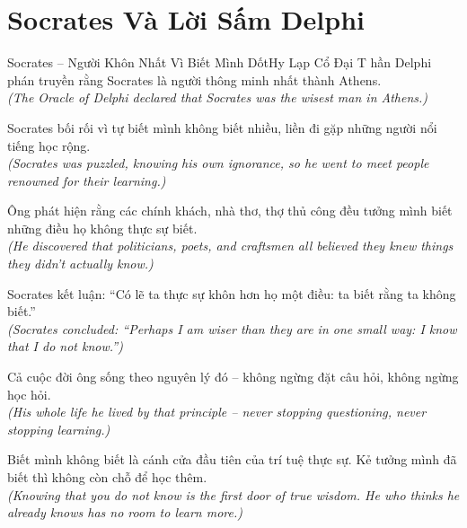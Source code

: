 \section{Socrates Và Lời Sấm Delphi}
\begin{truyen}{Socrates -- Người Khôn Nhất Vì Biết Mình Dốt}{Hy Lạp Cổ Đại}
T hần Delphi phán truyền rằng Socrates là người thông minh nhất thành Athens.\\
\textit{(The Oracle of Delphi declared that Socrates was the wisest man in Athens.)}

Socrates bối rối vì tự biết mình không biết nhiều, liền đi gặp những người nổi tiếng học rộng.\\
\textit{(Socrates was puzzled, knowing his own ignorance, so he went to meet people renowned for their learning.)}

Ông phát hiện rằng các chính khách, nhà thơ, thợ thủ công đều tưởng mình biết những điều họ không thực sự biết.\\
\textit{(He discovered that politicians, poets, and craftsmen all believed they knew things they didn't actually know.)}

Socrates kết luận: ``Có lẽ ta thực sự khôn hơn họ một điều: ta biết rằng ta không biết.''\\
\textit{(Socrates concluded: ``Perhaps I am wiser than they are in one small way: I know that I do not know.'')}

Cả cuộc đời ông sống theo nguyên lý đó -- không ngừng đặt câu hỏi, không ngừng học hỏi.\\
\textit{(His whole life he lived by that principle -- never stopping questioning, never stopping learning.)}

\end{truyen}
\begin{baihoc}
  Biết mình không biết là cánh cửa đầu tiên của trí tuệ thực sự. Kẻ tưởng mình đã biết thì không còn chỗ để học thêm.\\
  \textit{(Knowing that you do not know is the first door of true wisdom. He who thinks he already knows has no room to learn more.)}
\end{baihoc}

